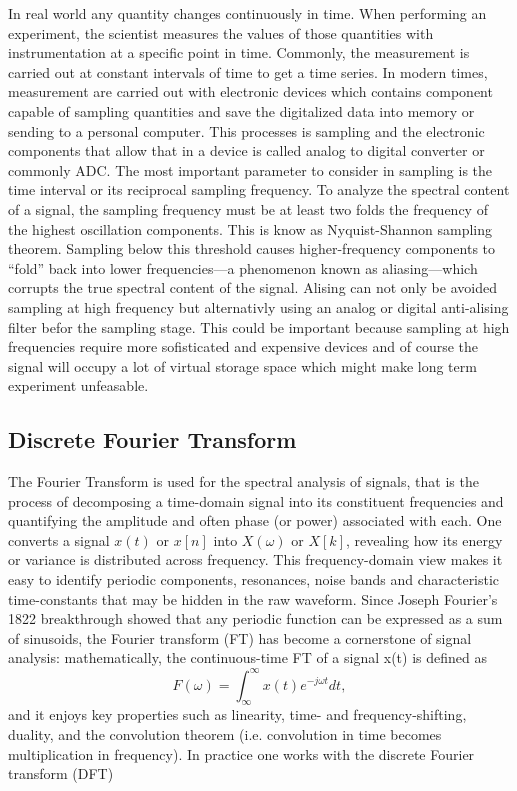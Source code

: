 In real world any quantity changes continuously in time. When performing an experiment, the scientist measures the values of those quantities with instrumentation at a specific point in time. Commonly, the measurement is carried out at constant intervals of time to get a time series. In modern times, measurement are carried out with electronic devices which contains component capable of sampling quantities and save the digitalized data into memory or sending to a personal computer. This processes is sampling and the electronic components that allow that in a device is called analog to digital converter or commonly ADC. The most important parameter to consider in sampling is the time interval or its reciprocal sampling frequency. To analyze the spectral content of a signal, the sampling frequency must be at least two folds the frequency of the highest oscillation components. This is know as Nyquist-Shannon sampling theorem. Sampling below this threshold causes higher-frequency components to “fold” back into lower frequencies—a phenomenon known as aliasing—which corrupts the true spectral content of the signal. Alising can not only be avoided sampling at high frequency but alternativly using an analog or digital anti-alising filter befor the sampling stage. This could be important  because sampling at high frequencies require more sofisticated and expensive devices and of course the signal will occupy a lot of virtual storage space which might make long term experiment unfeasable.

\subsection{Discrete Fourier Transform}

The Fourier Transform is used for the spectral analysis of signals, that is the process of decomposing a time-domain signal into its constituent frequencies and quantifying the amplitude and often phase (or power) associated with each. One converts a signal $x(t)$ or $x[n]$ into $X(\omega)$ or $X[k]$, revealing how its energy or variance is distributed across frequency. This frequency-domain view makes it easy to identify periodic components, resonances, noise bands and characteristic time-constants that may be hidden in the raw waveform. 
Since Joseph Fourier's 1822 breakthrough showed that any periodic function can be expressed as a sum of sinusoids, the Fourier transform (FT) has become a cornerstone of signal analysis: mathematically, the continuous-time FT of a signal x(t) is defined as
$$
F(\omega)=\int_{\infty}^{\infty} x(t) e^{-j\omega t} dt,
$$
and it enjoys key properties such as linearity, time- and frequency-shifting, duality, and the convolution theorem (i.e. convolution in time becomes multiplication in frequency). In practice one works with the discrete Fourier transform (DFT)

